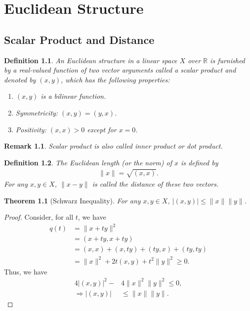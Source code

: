 \documentclass[11pt]{book}
\newtheorem{definition}{Definition}[chapter]
\newtheorem{theorem}{Theorem}[chapter]
\newtheorem{remark}{Remark}[chapter]
\theoremstyle{definition}
\numberwithin{equation}{chapter}
\begin{document}
\medskip

\chapter{Euclidean Structure}\label{chapter_7}
\section{Scalar Product and Distance}
\begin{definition}
An Euclidean structure in a linear space $X$ over $\mathbb{R}$ is furnished by a real-valued function of two vector arguments called a scalar product and denoted by $(x,y)$, which has the following properties:
\begin{enumerate}[label=(\arabic*)]
    \item $(x,y)$ is a bilinear function.
    \item Symmetricity: $(x,y) = (y,x)$.
    \item Positivity: $(x,x) > 0$ except for $x = 0$. 
\end{enumerate}
\end{definition}
\begin{remark}
Scalar product is also called inner product or dot product.
\end{remark}

\medskip

\begin{definition}
The Euclidean length (or the norm) of $x$ is defined by 
\begin{align*}
    \|x\| = \sqrt{(x,x)}.
\end{align*}
For any $x,y\in X$, $\|x- y\|$ is called the distance of these two vectors.
\end{definition}

\medskip

\begin{theorem}[Schwarz Inequality]
For any $x,y\in X$, $\left|(x,y)\right| \leq \|x\| \|y\|$.
\end{theorem}
\begin{proof}
Consider, for all $t$, we have
\begin{align*}
    q(t) & = \|x+ty\|^2 \\
    & = (x+ty,x+ty) \\
    & = (x,x) + (x,ty) + (ty,x) + (ty,ty) \\
    & = \|x\|^2 + 2t (x,y) + t^2 \|y\|^2  \geq 0.
\end{align*}
Thus, we have 
\begin{align*}
    4\left|(x,y)\right|^2 - & 4 \|x\|^2 \|y\|^2 \leq 0, \\
    \Rightarrow \left|(x,y)\right| & \leq \|x\| \|y\|.
\end{align*}
\end{proof}
\end{document}
